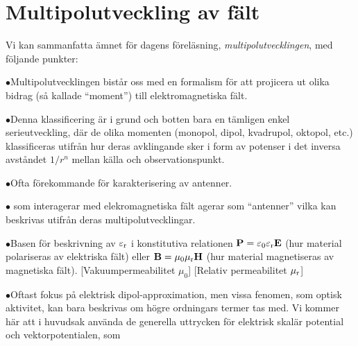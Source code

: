 {{{{{\section{Multipolutveckling av f{\"a}lt}
Vi kan sammanfatta {\"a}mnet f{\"o}r dagens f{\"o}rel{\"a}sning,
{\it multipolutvecklingen},
med f{\"o}ljande punkter:
\item{$\bullet$}{Multipolutvecklingen bist{\aa}r oss med en formalism f{\"o}r
   att projicera ut olika bidrag (s{\aa} kallade ``moment'') till
   elektromagnetiska f{\"a}lt.}
\item{$\bullet$}{Denna klassificering {\"a}r i grund och botten bara en
   t{\"a}mligen enkel serieutveckling, d{\"a}r de olika momenten (monopol,
   dipol, kvadrupol, oktopol, etc.) klassificeras utifr{\aa}n hur deras
   avklingande sker i form av potenser i det inversa avst{\aa}ndet $1/r^n$
   mellan k{\"a}lla och observationspunkt.}
\item{$\bullet$}{Ofta f{\"o}rekommande f{\"o}r karakterisering av antenner.
                 }
\item{$\bullet$}{ som interagerar med elekromagnetiska f{\"a}lt
   agerar som ``antenner'' vilka kan beskrivas utifr{\aa}n deras
   multipolutvecklingar.}
\item{$\bullet$}{Basen f{\"o}r beskrivning av $\varepsilon_{\rm r}$ i konstitutiva
   relationen ${\bf P}=\varepsilon_0\varepsilon_{\rm r}{\bf E}$ (hur material
   polariseras av elektriska f{\"a}lt) eller ${\bf B}=\mu_0\mu_{\rm r}{\bf H}$
   (hur material magnetiseras av magnetiska f{\"a}lt).
   [Vakuumpermeabilitet $\mu_0$]
   [Relativ permeabilitet $\mu_{\rm r}$]}
\item{$\bullet$}{Oftast fokus p{\aa} elektrisk dipol-approximation, men vissa
   fenomen, som optisk aktivitet, kan bara beskrivas om h{\"o}gre ordningars
   termer tas med.}
\medskip
\noindent
Vi kommer h{\"a}r att i huvudsak anv{\"a}nda de generella uttrycken f{\"o}r
elektrisk skal{\"a}r potential och vektorpotentialen,
som}}}}}
